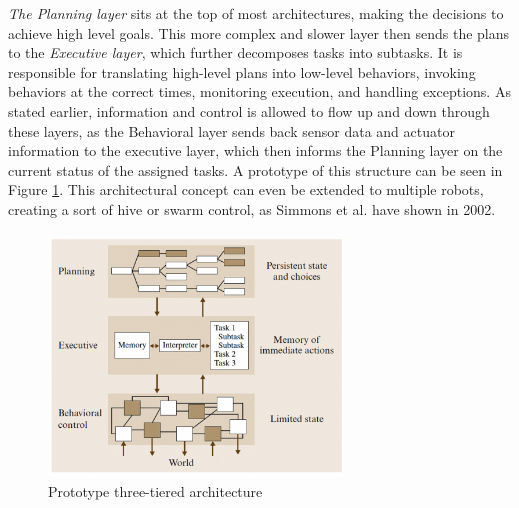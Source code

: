\documentclass[%
paper=A4,               %
twoside=true,           %
openright,              %
11pt,                   %
bibliography=totoc,     %
titlepage=on,           %
DIV=12,                 %
BCOR=1.5cm,             %
parskip=half,            %
final
]{scrreprt}
\begin{document}
	\textit{The Planning layer} sits at the top of most architectures, making the decisions to achieve high level goals. This more complex and slower layer then sends the plans to the \textit{Executive layer}, which further decomposes tasks into subtasks. It is responsible for translating high-level plans into low-level behaviors, invoking behaviors at the correct times, monitoring execution, and handling exceptions. \autocite{schillingAutonomeSystemeUnd2023,simmonsLayeredArchitectureCoordination2002,volpeCLARAtyArchitectureRobotic2001} 
	As stated earlier, information and control is allowed to flow up and down through these layers, as the Behavioral layer sends back sensor data and actuator  information to the executive layer, which then informs the Planning layer on the current status of the assigned tasks. \autocite{jun-youngjungThreelayeredHybridArchitecture2008} A prototype of this structure can be seen in Figure \ref{fig: fig3}. 
	This architectural concept can even be extended to multiple robots, creating a sort of hive or swarm control, as Simmons et al. have shown in 2002. \autocite{simmonsLayeredArchitectureCoordination2002}
	
	\begin{figure}[ht]
		\centering
		\includegraphics[width=0.7\textwidth]{Graphics/three-layered-Architecture}
		\caption{Prototype three-tiered architecture \autocite{sicilianoSpringerHandbookRobotics2016}}
		\label{fig: fig3}
	\end{figure}
	\newpage
	
\end{document}

